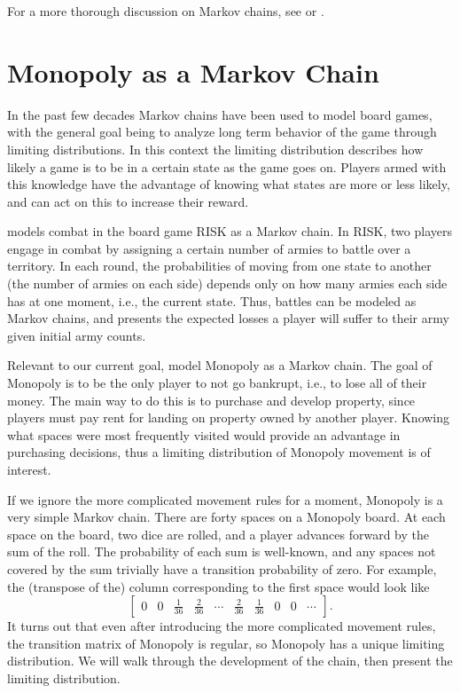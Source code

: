 \documentclass[12pt]{article}
\theoremstyle{definition}
\begin{document}
For a more thorough discussion on Markov chains, see
\citet{allen2010introduction} or \citet{bremaud1998markov}.

\section{Monopoly as a Markov Chain}
\label{sec:monopoly_as_a_markov_chain}


In the past few decades Markov chains have been used to model board games, with
the general goal being to analyze long term behavior of the game through
limiting distributions. In this context the limiting distribution describes how
likely a game is to be in a certain state as the game goes on. Players armed
with this knowledge have the advantage of knowing what states are more or less
likely, and can act on this to increase their reward.

\citet{osborne2003risk} models combat in the board game RISK as a Markov chain.
In RISK, two players engage in combat by assigning a certain number of armies
to battle over a territory. In each round, the probabilities of moving from one
state to another (the number of armies on each side) depends only on how many
armies each side has at one moment, i.e., the current state. Thus, battles can
be modeled as Markov chains, and \cite{osborne2003risk} presents the expected
losses a player will suffer to their army given initial army counts.

Relevant to our current goal, \citet{abbott1997boardwalk} model Monopoly as a
Markov chain. The goal of Monopoly is to be the only player to not go bankrupt,
i.e., to lose all of their money. The main way to do this is to purchase and
develop property, since players must pay rent for landing on property owned by
another player. Knowing what spaces were most frequently visited would provide
an advantage in purchasing decisions, thus a limiting distribution of Monopoly
movement is of interest.

If we ignore the more complicated movement rules for a moment, Monopoly is a
very simple Markov chain. There are forty spaces on a Monopoly board. At each
space on the board, two dice are rolled, and a player advances forward by the
sum of the roll. The probability of each sum is well-known, and any spaces not
covered by the sum trivially have a transition probability of zero. For
example, the (transpose of the) column corresponding to the first space would
look like
$$
\begin{bmatrix}
    0 & 0 & \frac{1}{36} & \frac{2}{36} & \cdots & \frac{2}{36} & \frac{1}{36}
    & 0 & 0 & \cdots
\end{bmatrix}.
$$
It turns out that even after introducing the more complicated movement rules,
the transition matrix of Monopoly is regular, so Monopoly has a unique limiting
distribution. We will walk through the development of the chain, then present
the limiting distribution.
\end{document}
